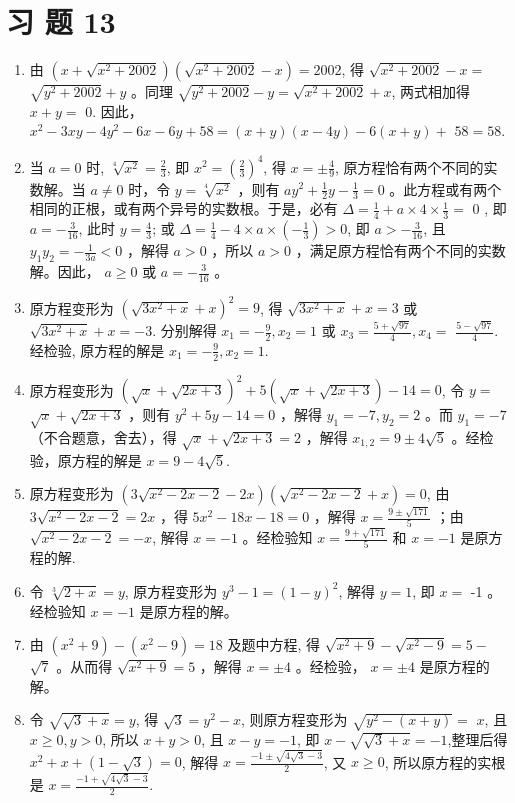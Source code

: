 \documentclass[10pt]{article}
\begin{document}
\section*{习 题 13}
\begin{enumerate}
  \item 由 $\left(x+\sqrt{x^{2}+2002}\right)\left(\sqrt{x^{2}+2002}-x\right)=2002$, 得 $\sqrt{x^{2}+2002}-x=$ $\sqrt{y^{2}+2002}+y$ 。同理 $\sqrt{y^{2}+2002}-y=\sqrt{x^{2}+2002}+x$, 两式相加得 $x+y=$ 0. 因此， $x^{2}-3 x y-4 y^{2}-6 x-6 y+58=(x+y)(x-4 y)-6(x+y)+$ $58=58$.
  \item 当 $a=0$ 时, $\sqrt[4]{x^{2}}=\frac{2}{3}$, 即 $x^{2}=\left(\frac{2}{3}\right)^{4}$, 得 $x= \pm \frac{4}{9}$, 原方程恰有两个不同的实数解。当 $a \neq 0$ 时，令 $y=\sqrt[4]{x^{2}}$ ，则有 $a y^{2}+\frac{1}{2} y-\frac{1}{3}=0$ 。此方程或有两个相同的正根，或有两个异号的实数根。于是，必有 $\Delta=\frac{1}{4}+a \times 4 \times \frac{1}{3}=$ 0 , 即 $a=-\frac{3}{16}$, 此时 $y=\frac{4}{3}$; 或 $\Delta=\frac{1}{4}-4 \times a \times\left(-\frac{1}{3}\right)>0$, 即 $a>-\frac{3}{16}$, 且 $y_{1} y_{2}=-\frac{1}{3 a}<0$ ，解得 $a>0$ ，所以 $a>0$ ，满足原方程恰有两个不同的实数解。因此， $a \geqslant 0$ 或 $a=-\frac{3}{16}$ 。
  \item 原方程变形为 $\left(\sqrt{3 x^{2}+x}+x\right)^{2}=9$, 得 $\sqrt{3 x^{2}+x}+x=3$ 或\\
$\sqrt{3 x^{2}+x}+x=-3$. 分别解得 $x_{1}=-\frac{9}{2}, x_{2}=1$ 或 $x_{3}=\frac{5+\sqrt{97}}{4}, x_{4}=$ $\frac{5-\sqrt{97}}{4}$. 经检验, 原方程的解是 $x_{1}=-\frac{9}{2}, x_{2}=1$.
  \item 原方程变形为 $(\sqrt{x}+\sqrt{2 x+3})^{2}+5(\sqrt{x}+\sqrt{2 x+3})-14=0$, 令 $y=$ $\sqrt{x}+\sqrt{2 x+3}$ ，则有 $y^{2}+5 y-14=0$ ，解得 $y_{1}=-7, y_{2}=2$ 。而 $y_{1}=-7$ （不合题意，舍去），得 $\sqrt{x}+\sqrt{2 x+3}=2$ ，解得 $x_{1,2}=9 \pm 4 \sqrt{5}$ 。经检验，原方程的解是 $x=9-4 \sqrt{5}$.
  \item 原方程变形为 $\left(3 \sqrt{x^{2}-2 x-2}-2 x\right)\left(\sqrt{x^{2}-2 x-2}+x\right)=0$, 由 $3 \sqrt{x^{2}-2 x-2}=2 x$ ，得 $5 x^{2}-18 x-18=0$ ，解得 $x=\frac{9 \pm \sqrt{171}}{5}$ ；由 $\sqrt{x^{2}-2 x-2}=-x$, 解得 $x=-1$ 。经检验知 $x=\frac{9+\sqrt{171}}{5}$ 和 $x=-1$ 是原方程的解.
  \item 令 $\sqrt[3]{2+x}=y$, 原方程变形为 $y^{3}-1=(1-y)^{2}$, 解得 $y=1$, 即 $x=$ -1 。经检验知 $x=-1$ 是原方程的解。
  \item 由 $\left(x^{2}+9\right)-\left(x^{2}-9\right)=18$ 及题中方程, 得 $\sqrt{x^{2}+9}-\sqrt{x^{2}-9}=5-$ $\sqrt{7}$ 。从而得 $\sqrt{x^{2}+9}=5$ ，解得 $x= \pm 4$ 。经检验， $x= \pm 4$ 是原方程的解。
  \item 令 $\sqrt{\sqrt{3}+x}=y$, 得 $\sqrt{3}=y^{2}-x$, 则原方程变形为 $\sqrt{y^{2}-(x+y)}=$ $x$, 且 $x \geqslant 0, y>0$, 所以 $x+y>0$, 且 $x-y=-1$, 即 $x-\sqrt{\sqrt{3}+x}=-1$,整理后得 $x^{2}+x+(1-\sqrt{3})=0$, 解得 $x=\frac{-1 \pm \sqrt{4 \sqrt{3}-3}}{2}$, 又 $x \geqslant 0$, 所以原方程的实根是 $x=\frac{-1+\sqrt{4 \sqrt{3}-3}}{2}$.
\end{enumerate}
\end{document}
